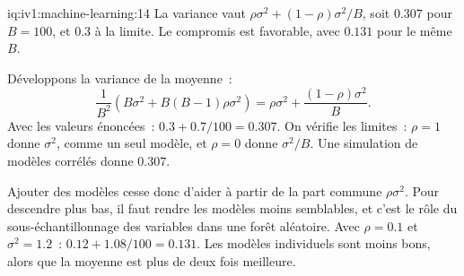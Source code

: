 \begin{solution}{iq:iv1:machine-learning:14}
La variance vaut $\rho\sigma^2 + (1 - \rho)\sigma^2/B$, soit $0.307$ pour $B = 100$, et $0.3$ à la limite. Le compromis est favorable, avec $0.131$ pour le même $B$.

Développons la variance de la moyenne~:
\[
\frac{1}{B^2}\left(B\sigma^2 + B(B - 1)\rho\sigma^2\right) = \rho\sigma^2 + \frac{(1 - \rho)\sigma^2}{B}.
\]
Avec les valeurs énoncées~: $0.3 + 0.7/100 = 0.307$. On vérifie les limites~: $\rho = 1$ donne $\sigma^2$, comme un seul modèle, et $\rho = 0$ donne $\sigma^2/B$. Une simulation de modèles corrélés donne $0.307$.

Ajouter des modèles cesse donc d'aider à partir de la part commune $\rho\sigma^2$. Pour descendre plus bas, il faut rendre les modèles moins semblables, et c'est le rôle du sous-échantillonnage des variables dans une forêt aléatoire. Avec $\rho = 0.1$ et $\sigma^2 = 1.2$~: $0.12 + 1.08/100 = 0.131$. Les modèles individuels sont moins bons, alors que la moyenne est plus de deux fois meilleure.



\end{solution}

